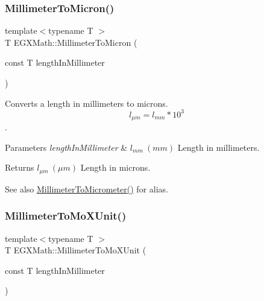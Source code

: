 \subsubsection{\texorpdfstring{Millimeter\+To\+Micron()}{MillimeterToMicron()}}
{\footnotesize\ttfamily template$<$typename T $>$ \\
T E\+G\+X\+Math\+::\+Millimeter\+To\+Micron (\begin{DoxyParamCaption}\item[{const T}]{length\+In\+Millimeter }\end{DoxyParamCaption})}



Converts a length in millimeters to microns. \[ l_{\mu m}=l_{mm} * 10^{3} \]. 


\begin{DoxyParams}{Parameters}
{\em length\+In\+Millimeter} & $ l_{mm}\ (mm)$ Length in millimeters. \\
\hline
\end{DoxyParams}
\begin{DoxyReturn}{Returns}
$ l_{\mu m}\ (\mu m)$ Length in microns. 
\end{DoxyReturn}
\begin{DoxySeeAlso}{See also}
\mbox{\hyperlink{group___e_g_x_math-_conversions-_length_conversions-_millimeter-_s_i_gadec5d89ecdd6bfe638f54ceffe0e0630}{Millimeter\+To\+Micrometer()}} for alias. 
\end{DoxySeeAlso}
\mbox{\label{group___e_g_x_math-_conversions-_length_conversions-_millimeter-_non-_s_i_ga1f0be98bc702f46a69579b27e05a2439}} 
\subsubsection{\texorpdfstring{Millimeter\+To\+Mo\+X\+Unit()}{MillimeterToMoXUnit()}}
{\footnotesize\ttfamily template$<$typename T $>$ \\
T E\+G\+X\+Math\+::\+Millimeter\+To\+Mo\+X\+Unit (\begin{DoxyParamCaption}\item[{const T}]{length\+In\+Millimeter }\end{DoxyParamCaption})}



